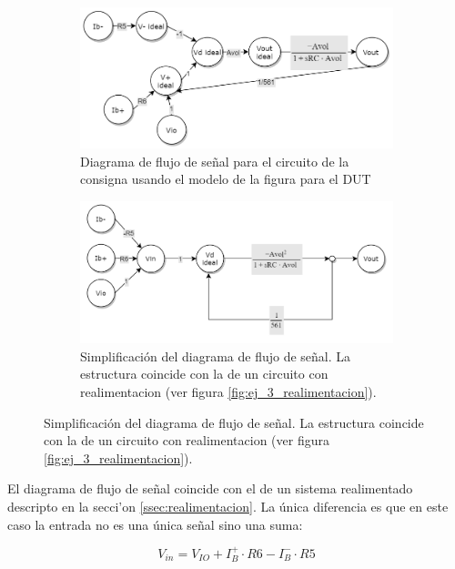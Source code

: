 \documentclass[../../main.tex]{subfiles}
\begin{document}
\begin{figure}[htpb]%
	\centering
	\begin{subfigure}[t]{0.49\textwidth}
		\centering
		\includegraphics[width=\textwidth]{imagenes/signal_flow_consigna.png}
		\caption{Diagrama de flujo de se\~nal para el circuito de la consigna usando el modelo de la figura para el DUT}
		\label{fig:ej_3_signal_flow_consigna_no_simplificado}
	\end{subfigure}%
	\hfill%
	\begin{subfigure}[t]{0.49\textwidth}
		\centering
		\includegraphics[width=\textwidth]{imagenes/signal_flow_consigna_simplificado.png}
		\caption{Simplificaci\'on del diagrama de flujo de se\~nal. La estructura coincide con la de un circuito con realimentacion (ver figura \ref{fig:ej_3_realimentacion}). }
		\label{fig:ej_3_signal_flow_consigna_simplificado}
	\end{subfigure}
	\label{fig:ej_3_signal_flow_consigna}	
\end{figure}


El diagrama de flujo de se\~nal coincide con el de un sistema realimentado descripto en la secci'on \ref{ssec:realimentacion}. La \'unica diferencia es que en este caso la entrada no es una \'unica se\~nal sino una suma:

\begin{equation}
	V_{in} = V_{IO} + I_B^+\cdot R6 - I_B^-\cdot R5
	\label{eq:ej_3_vin_aparente}
\end{equation}
\end{document}
